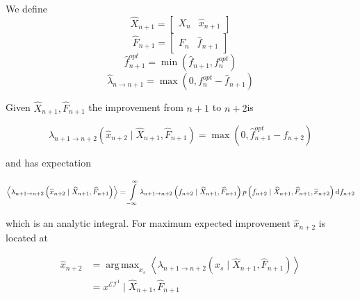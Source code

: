 \documentclass[11pt]{article}
\DeclareMathOperator*{\argmax}{arg\,max}
\begin{document}
We define 
\begin{equation}
\widehat{X}_{n+1}	=\begin{bmatrix}X_{n} & \widehat{x}_{n+1}\end{bmatrix}
\end{equation}
\begin{equation}
\widehat{F}_{n+1}	=\begin{bmatrix}F_{n} & \widehat{f}_{n+1}\end{bmatrix}
\end{equation}
\begin{equation}
\widehat{f}_{n+1}^{opt}	=\min\left(\widehat{f}_{n+1},f_{n}^{opt}\right)
\end{equation}
\begin{equation}
\widehat{\lambda}_{n\rightarrow n+1}	=\max\left(0,f_{n}^{opt}-\widehat{f}_{n+1}\right)
\end{equation}

Given $\widehat{X}_{n+1},\widehat{F}_{n+1}$  the improvement from $n+1$ to $n+2$is

\begin{equation}\lambda_{n+1\rightarrow n+2}\left(\widehat{x}_{n+2}\mid\widehat{X}_{n+1},\widehat{F}_{n+1}\right)=\max\left(0,\widehat{f}_{n+1}^{opt}-f_{n+2}\right)
\end{equation}

and has expectation

\begin{equation}
\left\langle \lambda_{n+1\rightarrow n+2}\left(\widehat{x}_{n+2}\mid\widehat{X}_{n+1},\widehat{F}_{n+1}\right)\right\rangle =\intop_{-\infty}^{\infty}\lambda_{n+1\rightarrow n+2}\left(f_{n+2}\mid\widehat{X}_{n+1},\widehat{F}_{n+1}\right)p\left(f_{n+2}\mid\widehat{X}_{n+1},\widehat{F}_{n+1},\widehat{x}_{n+2}\right)\mathrm{d}f_{n+2}
\end{equation}

which is an analytic integral. For maximum expected improvement $\widehat{x}_{n+2}$ is located at
  

\begin{equation}
\begin{split}
\widehat{x}_{n+2}	&=\argmax_{x_{s}}\left\langle \lambda_{n+1\rightarrow n+2}\left(x_{s}\mid\widehat{X}_{n+1},\widehat{F}_{n+1}\right)\right\rangle \\
	&=x^{\mathcal{EI}^{1}}\mid\widehat{X}_{n+1},\widehat{F}_{n+1}\\
\end{split}
\end{equation}
\end{document}
